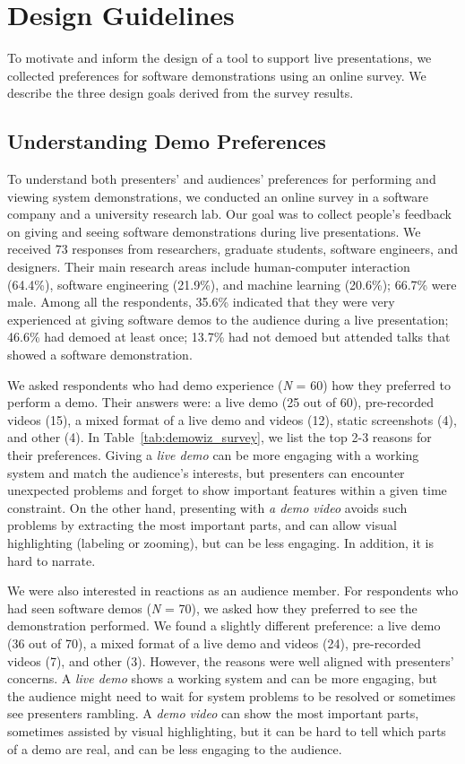 \section{Design Guidelines}

To motivate and inform the design of a tool to support live presentations, we collected preferences for software demonstrations using an online survey. We describe the three design goals derived from the survey results.

\subsection{Understanding Demo Preferences} To understand both presenters' and audiences' preferences for performing and viewing system demonstrations, we conducted an online survey in a software company and a university research lab. Our goal was to collect people's feedback on giving and seeing software demonstrations during live presentations. We received 73 responses from researchers, graduate students, software engineers, and designers. Their main research areas include human-computer interaction (64.4\%), software engineering (21.9\%), and machine learning (20.6\%); 66.7\% were male. Among all the respondents, 35.6\% indicated that they were very experienced at giving software demos to the audience during a live presentation; 46.6\% had demoed at least once; 13.7\% had not demoed but attended talks that showed a software demonstration.

We asked respondents who had demo experience (\textit{N} = 60) how they preferred to perform a demo. Their answers were: a live demo (25 out of 60), pre-recorded videos (15), a mixed format of a live demo and videos (12), static screenshots (4), and other (4). In Table~\ref{tab:demowiz_survey}, we list the top 2-3 reasons for their preferences. Giving a \textit{live demo} can be more engaging with a working system and match the audience's interests, but presenters can encounter unexpected problems and forget to show important features within a given time constraint. On the other hand, presenting with \textit{a demo video} avoids such problems by extracting the most important parts, and can allow visual highlighting (labeling or zooming), but can be less engaging. In addition, it is hard to narrate.

We were also interested in reactions as an audience member. For respondents who had seen software demos (\textit{N} = 70), we asked how they preferred to see the demonstration performed. We found a slightly different preference: a live demo (36 out of 70), a mixed format of a live demo and videos (24), pre-recorded videos (7), and other (3). However, the reasons were well aligned with presenters’ concerns. A\textit{ live demo} shows a working system and can be more engaging, but the audience might need to wait for system problems to be resolved or sometimes see presenters rambling. A\textit{ demo video }can show the most important parts, sometimes assisted by visual highlighting, but it can be hard to tell which parts of a demo are real, and can be less engaging to the audience.

